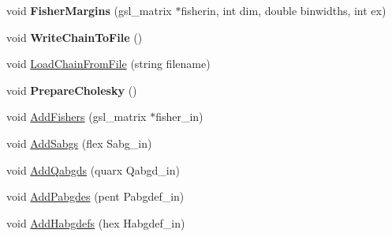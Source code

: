 \begin{DoxyCompactItemize}
\item 
\hypertarget{classDaliPaint_abc7235b287a0724e0240975bbfaee982}{void {\bfseries Fisher\-Margins} (gsl\-\_\-matrix $\ast$fisherin, int dim, double binwidths, int ex)}\label{classDaliPaint_abc7235b287a0724e0240975bbfaee982}

\item 
\hypertarget{classDaliPaint_ad99cfa41674c3a6696d4b80d491baf98}{void {\bfseries Write\-Chain\-To\-File} ()}\label{classDaliPaint_ad99cfa41674c3a6696d4b80d491baf98}

\item 
void \hyperlink{classDaliPaint_a0f445163538f24c880c1db00b36e95ac}{Load\-Chain\-From\-File} (string filename)
\item 
\hypertarget{classDaliPaint_a20bd310eb01d170d936d88420db6c7ae}{void {\bfseries Prepare\-Cholesky} ()}\label{classDaliPaint_a20bd310eb01d170d936d88420db6c7ae}

\item 
void \hyperlink{classDaliPaint_ad099767cb66f036a0462b214d5d863f0}{Add\-Fishers} (gsl\-\_\-matrix $\ast$fisher\-\_\-in)
\item 
void \hyperlink{classDaliPaint_a580450cad5f6e7d360840ebcb6ddcda0}{Add\-Sabgs} (flex Sabg\-\_\-in)
\item 
void \hyperlink{classDaliPaint_ad340988cbe7932902bc974c533be8852}{Add\-Qabgds} (quarx Qabgd\-\_\-in)
\item 
void \hyperlink{classDaliPaint_abd836e975a3815a10d1f43fdcb3eb47d}{Add\-Pabgdes} (pent Pabgdef\-\_\-in)
\item 
void \hyperlink{classDaliPaint_a7ed07e90dfd95e2352fddc1e593c01f8}{Add\-Habgdefs} (hex Habgdef\-\_\-in)
\end{DoxyCompactItemize}
